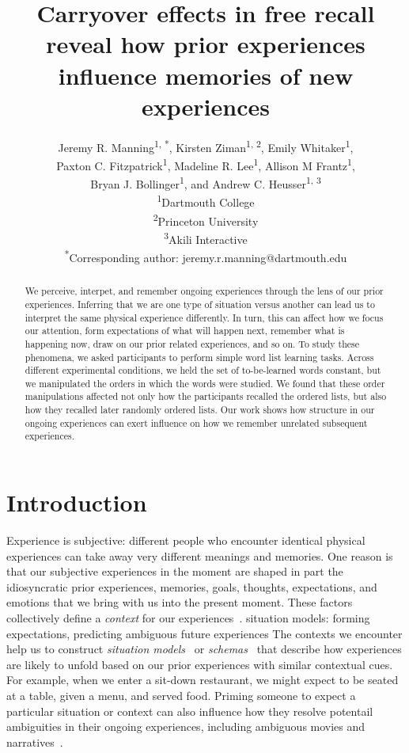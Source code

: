 \documentclass[11pt]{article}
\title{Carryover effects in free recall reveal how prior experiences influence
memories of new experiences}
\author{Jeremy R. Manning\textsuperscript{1, *}, Kirsten
Ziman\textsuperscript{1, 2}, Emily Whitaker\textsuperscript{1},\\Paxton C.
Fitzpatrick\textsuperscript{1}, Madeline R. Lee\textsuperscript{1}, 
Allison M Frantz\textsuperscript{1}, \\Bryan J.
Bollinger\textsuperscript{1}, and Andrew C. Heusser\textsuperscript{1,
3}\\\textsuperscript{1}Dartmouth College\\\textsuperscript{2}Princeton
University\\\textsuperscript{3}Akili
Interactive\\\textsuperscript{*}Corresponding author:
jeremy.r.manning@dartmouth.edu}
\date{}
\begin{document}
\maketitle

\begin{abstract} We perceive, interpet, and remember ongoing experiences
through the lens of our prior experiences. Inferring that we are one type of
situation versus another can lead us to interpret the same physical experience
differently. In turn, this can affect how we focus our attention, form
expectations of what will happen next, remember what is happening now, draw on
our prior related experiences, and so on. To study these phenomena, we asked
participants to perform simple word list learning tasks. Across different
experimental conditions, we held the set of to-be-learned words constant, but
we manipulated the orders in which the words were studied. We found that these
order manipulations affected not only how the participants recalled the ordered
lists, but also how they recalled later randomly ordered lists. Our work shows
how structure in our ongoing experiences can exert influence on how we remember
unrelated subsequent experiences. \end{abstract}


\section*{Introduction}


Experience is subjective: different people who encounter identical physical
experiences can take away very different meanings and memories. One reason is
that our subjective experiences in the moment are shaped in part the
idiosyncratic prior experiences, memories, goals, thoughts, expectations, and
emotions that we bring with us into the present moment. These factors
collectively define a \textit{context} for our experiences~\citep{Mann20}. %
situation models: forming expectations, predicting ambiguous future experiences
The contexts we encounter help us to construct \textit{situation
models}~\citep{RangRitc12, MannEtal15} or \textit{schemas}~\citep{MasiEtal22,
BaldEtal18} that describe how experiences are likely to unfold based on our
prior experiences with similar contextual cues. For example, when we enter a
sit-down restaurant, we might expect to be seated at a table, given a menu, and
served food. Priming someone to expect a particular situation or context can
also influence how they resolve potentail ambiguities in their ongoing
experiences, including ambiguous movies and narratives~\citep{YeshEtal17}.
\end{document}
